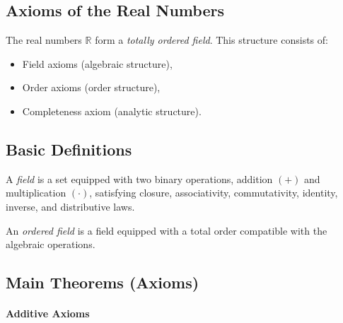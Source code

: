 
\subsection{Axioms of the Real Numbers}

\begin{exposition}
The real numbers $\mathbb{R}$ form a \emph{totally ordered field}.
This structure consists of:
\end{exposition}

\begin{itemize}
\item Field axioms (algebraic structure),
\item Order axioms (order structure),
\item Completeness axiom (analytic structure).
\end{itemize}

\subsection*{Basic Definitions}

\begin{remark*}
A \emph{field} is a set equipped with two binary operations,
addition $(+)$ and multiplication $(\cdot)$,
satisfying closure, associativity, commutativity,
identity, inverse, and distributive laws.

An \emph{ordered field} is a field equipped with a total order
compatible with the algebraic operations.
\end{remark*}

\subsection*{Main Theorems (Axioms)}


\paragraph{Additive Axioms}

